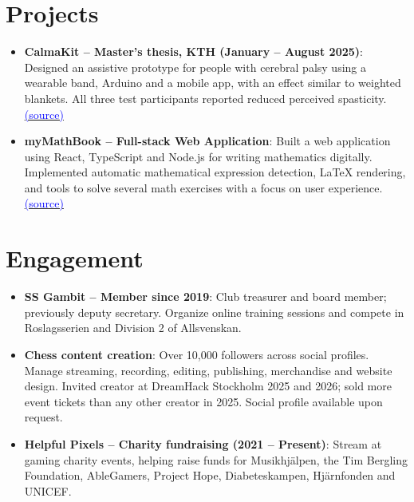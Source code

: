 \documentclass[a4paper,11pt]{article}
\newcommand{\resumeItem}[2]{
  \item\small{
    \textbf{#1}{: #2 \vspace{-2pt}}
  }
}
\newcommand{\resumeSubItem}[2]{\resumeItem{#1}{#2}\vspace{-4pt}}
\newcommand{\resumeSubHeadingListStart}{\begin{itemize}[leftmargin=*]}
\newcommand{\resumeSubHeadingListEnd}{\end{itemize}}
\newcommand{\resumeItemListEnd}{\end{itemize}\vspace{-5pt}}
\begin{document}
\section{Projects}
\resumeSubHeadingListStart
\resumeSubItem{CalmaKit -- Master's thesis, KTH (January -- August 2025)}{Designed an assistive prototype for people with cerebral palsy using a wearable band, Arduino and a mobile app, with an effect similar to weighted blankets. All three test participants reported reduced perceived spasticity. \href{https://www.diva-portal.org/smash/record.jsf?pid=diva2:2037729}{\textnormal{\textcolor{blue}{(source)}}}}
\resumeSubItem{myMathBook -- Full-stack Web Application}{Built a web application using React, TypeScript and Node.js for writing mathematics digitally. Implemented automatic mathematical expression detection, LaTeX rendering, and tools to solve several math exercises with a focus on user experience.\href{https://mymathbook.sebastianhallman.com/}{\textnormal{\textcolor{blue}{(source)}}}}
\resumeItemListEnd

\section{Engagement}
\resumeSubHeadingListStart
\resumeSubItem{SS Gambit -- Member since 2019}{Club treasurer and board member; previously deputy secretary. Organize online training sessions and compete in Roslagsserien and Division 2 of Allsvenskan.}
\resumeSubItem{Chess content creation}{Over 10,000 followers across social profiles. Manage streaming, recording, editing, publishing, merchandise and website design. Invited creator at DreamHack Stockholm 2025 and 2026; sold more event tickets than any other creator in 2025. Social profile available upon request.}
\resumeSubItem{Helpful Pixels -- Charity fundraising (2021 -- Present)}{Stream at gaming charity events, helping raise funds for Musikhjälpen, the Tim Bergling Foundation, AbleGamers, Project Hope, Diabeteskampen, Hjärnfonden and UNICEF.}
\resumeSubHeadingListEnd
\end{document}
